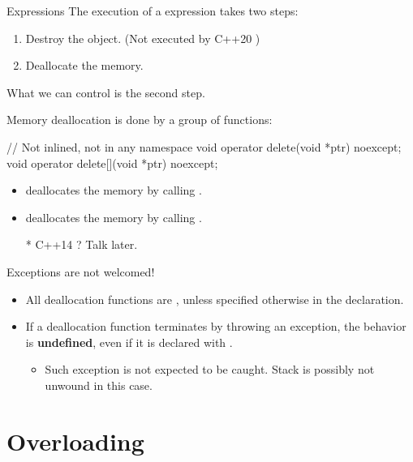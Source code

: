 \documentclass{beamer}
\begin{document}
\begin{frame}{ Expressions}
  The execution of a  expression takes two steps:
  \begin{enumerate}
      \item Destroy the object. {\small(Not executed by C++20 )}
    \item Deallocate the memory.
  \end{enumerate}
  What we can control is the second step.
\end{frame}

\begin{frame}[fragile]{}
  Memory deallocation is done by a group of functions:
  \begin{cpp}
// Not inlined, not in any namespace
void operator delete(void *ptr) noexcept;
void operator delete[](void *ptr) noexcept;
  \end{cpp}
  \begin{itemize}
    \item {} deallocates the memory by calling .
    \item {} deallocates the memory by calling .
    \item[*]{\footnotesize C++14 ? Talk later.}
  \end{itemize}
\end{frame}

\begin{frame}[fragile]{}
  Exceptions are not welcomed!
  \begin{itemize}
    \item All deallocation functions are , unless specified otherwise in the declaration.
    \item If a deallocation function terminates by throwing an exception, the behavior is \textbf{undefined}, even if it is declared with .
    \begin{itemize}
      \item Such exception is not expected to be caught. Stack is possibly not unwound in this case.
    \end{itemize}
  \end{itemize}
\end{frame}

\section{Overloading }
\end{document}
